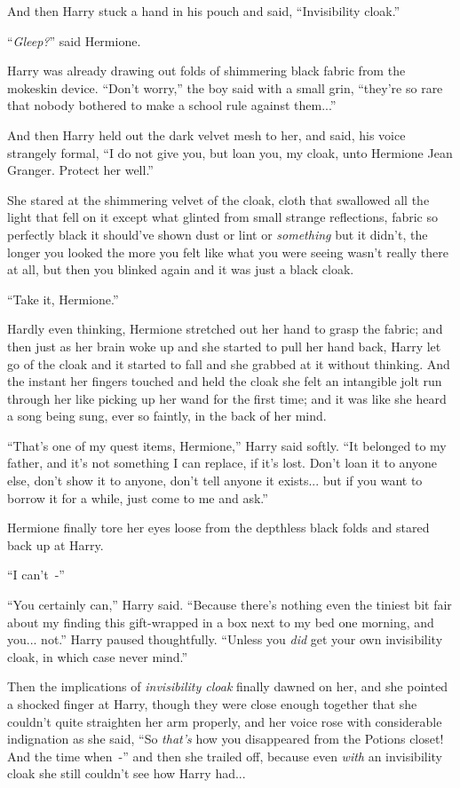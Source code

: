 And then Harry stuck a hand in his pouch and said, ``Invisibility cloak.''

``\emph{Gleep?}'' said Hermione.

Harry was already drawing out folds of shimmering black fabric from the mokeskin device. ``Don't worry,'' the boy said with a small grin, ``they're so rare that nobody bothered to make a school rule against them...''

And then Harry held out the dark velvet mesh to her, and said, his voice strangely formal, ``I do not give you, but loan you, my cloak, unto Hermione Jean Granger. Protect her well.''

She stared at the shimmering velvet of the cloak, cloth that swallowed all the light that fell on it except what glinted from small strange reflections, fabric so perfectly black it should've shown dust or lint or \emph{something} but it didn't, the longer you looked the more you felt like what you were seeing wasn't really there at all, but then you blinked again and it was just a black cloak.

``Take it, Hermione.''

Hardly even thinking, Hermione stretched out her hand to grasp the fabric; and then just as her brain woke up and she started to pull her hand back, Harry let go of the cloak and it started to fall and she grabbed at it without thinking. And the instant her fingers touched and held the cloak she felt an intangible jolt run through her like picking up her wand for the first time; and it was like she heard a song being sung, ever so faintly, in the back of her mind.

``That's one of my quest items, Hermione,'' Harry said softly. ``It belonged to my father, and it's not something I can replace, if it's lost. Don't loan it to anyone else, don't show it to anyone, don't tell anyone it exists... but if you want to borrow it for a while, just come to me and ask.''

Hermione finally tore her eyes loose from the depthless black folds and stared back up at Harry.

``I can't~-''

``You certainly can,'' Harry said. ``Because there's nothing even the tiniest bit fair about my finding this gift-wrapped in a box next to my bed one morning, and you... not.'' Harry paused thoughtfully. ``Unless you \emph{did} get your own invisibility cloak, in which case never mind.''

Then the implications of \emph{invisibility cloak} finally dawned on her, and she pointed a shocked finger at Harry, though they were close enough together that she couldn't quite straighten her arm properly, and her voice rose with considerable indignation as she said, ``So \emph{that's} how you disappeared from the Potions closet! And the time when~-'' and then she trailed off, because even \emph{with} an invisibility cloak she still couldn't see how Harry had...

